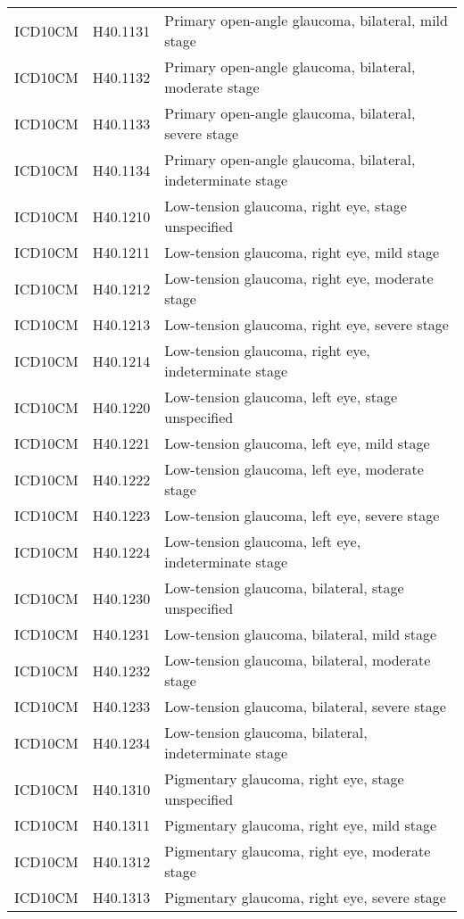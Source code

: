 \begin{longtable}{p{}p{}p{}}
  ICD10CM & H40.1131 & Primary open-angle glaucoma, bilateral, mild stage \\ 
  ICD10CM & H40.1132 & Primary open-angle glaucoma, bilateral, moderate stage \\ 
  ICD10CM & H40.1133 & Primary open-angle glaucoma, bilateral, severe stage \\ 
  ICD10CM & H40.1134 & Primary open-angle glaucoma, bilateral, indeterminate stage \\ 
  ICD10CM & H40.1210 & Low-tension glaucoma, right eye, stage unspecified \\ 
  ICD10CM & H40.1211 & Low-tension glaucoma, right eye, mild stage \\ 
  ICD10CM & H40.1212 & Low-tension glaucoma, right eye, moderate stage \\ 
  ICD10CM & H40.1213 & Low-tension glaucoma, right eye, severe stage \\ 
  ICD10CM & H40.1214 & Low-tension glaucoma, right eye, indeterminate stage \\ 
  ICD10CM & H40.1220 & Low-tension glaucoma, left eye, stage unspecified \\ 
  ICD10CM & H40.1221 & Low-tension glaucoma, left eye, mild stage \\ 
  ICD10CM & H40.1222 & Low-tension glaucoma, left eye, moderate stage \\ 
  ICD10CM & H40.1223 & Low-tension glaucoma, left eye, severe stage \\ 
  ICD10CM & H40.1224 & Low-tension glaucoma, left eye, indeterminate stage \\ 
  ICD10CM & H40.1230 & Low-tension glaucoma, bilateral, stage unspecified \\ 
  ICD10CM & H40.1231 & Low-tension glaucoma, bilateral, mild stage \\ 
  ICD10CM & H40.1232 & Low-tension glaucoma, bilateral, moderate stage \\ 
  ICD10CM & H40.1233 & Low-tension glaucoma, bilateral, severe stage \\ 
  ICD10CM & H40.1234 & Low-tension glaucoma, bilateral, indeterminate stage \\ 
  ICD10CM & H40.1310 & Pigmentary glaucoma, right eye, stage unspecified \\ 
  ICD10CM & H40.1311 & Pigmentary glaucoma, right eye, mild stage \\ 
  ICD10CM & H40.1312 & Pigmentary glaucoma, right eye, moderate stage \\ 
  ICD10CM & H40.1313 & Pigmentary glaucoma, right eye, severe stage \\ 

\end{longtable}

